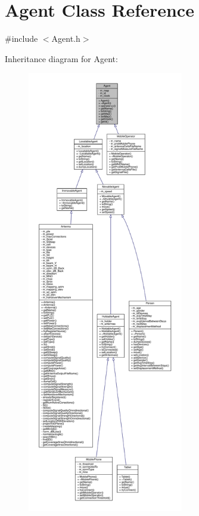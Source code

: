 \hypertarget{class_agent}{}\section{Agent Class Reference}
\label{class_agent}


{\ttfamily \#include $<$Agent.\+h$>$}



Inheritance diagram for Agent\+:
\nopagebreak
\begin{figure}[H]
\begin{center}
\leavevmode
\includegraphics[height=550pt]{class_agent__inherit__graph}
\end{center}
\end{figure}


